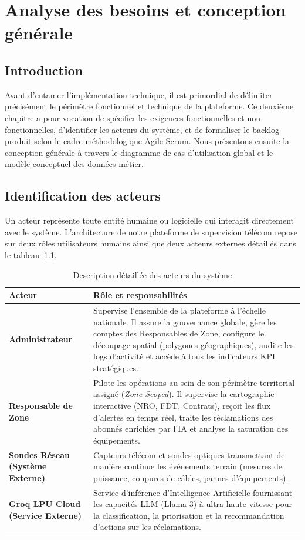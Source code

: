 \chapter{Analyse des besoins et conception g\'en\'erale}
\label{chap:requirements}

\section*{Introduction}
Avant d'entamer l'impl\'ementation technique, il est primordial de d\'elimiter pr\'ecis\'ement le p\'erim\`etre fonctionnel et technique de la plateforme. Ce deuxi\`eme chapitre a pour vocation de sp\'ecifier les exigences fonctionnelles et non fonctionnelles, d'identifier les acteurs du syst\`eme, et de formaliser le backlog produit selon le cadre m\'ethodologique Agile Scrum. Nous pr\'esentons ensuite la conception g\'en\'erale \`a travers le diagramme de cas d'utilisation global et le mod\`ele conceptuel des donn\'ees m\'etier.

\section{Identification des acteurs}
Un acteur repr\'esente toute entit\'e humaine ou logicielle qui interagit directement avec le syst\`eme. L'architecture de notre plateforme de supervision t\'el\'ecom repose sur deux r\^oles utilisateurs humains ainsi que deux acteurs externes d\'etaill\'es dans le tableau~\ref{tab:acteurs}.

\begin{table}[H]
\centering
\begin{tabular}{|p{4.2cm}|p{9.8cm}|}
\hline
\textbf{Acteur} & \textbf{R\^ole et responsabilit\'es} \\
\hline
\textbf{Administrateur} & Supervise l'ensemble de la plateforme \`a l'\'echelle nationale. Il assure la gouvernance globale, g\`ere les comptes des Responsables de Zone, configure le d\'ecoupage spatial (polygones g\'eographiques), audite les logs d'activit\'e et acc\`ede \`a tous les indicateurs KPI strat\'egiques. \\
\hline
\textbf{Responsable de Zone} & Pilote les op\'erations au sein de son p\'erim\`etre territorial assign\'e (\textit{Zone-Scoped}). Il supervise la cartographie interactive (NRO, FDT, Contrats), re\c{c}oit les flux d'alertes en temps r\'eel, traite les r\'eclamations des abonn\'es enrichies par l'IA et analyse la saturation des \'equipements. \\
\hline
\textbf{Sondes R\'eseau (Syst\`eme Externe)} & Capteurs t\'el\'ecom et sondes optiques transmettant de mani\`ere continue les \'ev\'enements terrain (mesures de puissance, coupures de c\^ables, pannes d'\'equipements). \\
\hline
\textbf{Groq LPU Cloud (Service Externe)} & Service d'inf\'erence d'Intelligence Artificielle fournissant les capacit\'es LLM (Llama 3) \`a ultra-haute vitesse pour la classification, la priorisation et la recommandation d'actions sur les r\'eclamations. \\
\hline
\end{tabular}
\caption{Description d\'etaill\'ee des acteurs du syst\`eme}
\label{tab:acteurs}
\end{table}


